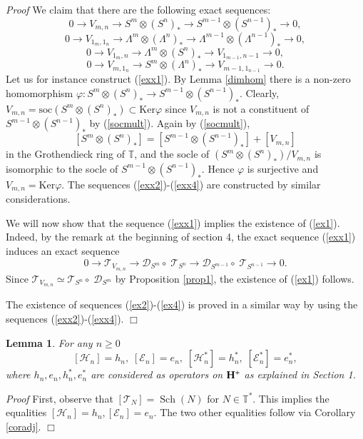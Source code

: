 \documentclass[11pt]{amsart}
\newcounter{theorem}
\newtheorem{lemma}[theo]{Lemma}
\renewenvironment{proof}{ \emph{Proof}}{$\Box$}
\newcommand{\TT}{\mathbb{T}}
\renewcommand {\phi} {\varphi}
\newcommand{\soc}{\mathrm{soc}}
\newcommand{\Ker}{\mathrm{Ker}}
\begin{document}
\begin{proof} We claim that there are the following exact sequences:
\begin{equation}\label{exx1}
0\rightarrow V_{m,n}\rightarrow S^m\otimes (S^n)_*\rightarrow S^{m-1}\otimes (S^{n-1})_*\rightarrow 0,
\end{equation}
\begin{equation}\label{exx2}
0\rightarrow V_{1_m,1_n}\rightarrow \Lambda^m\otimes (\Lambda^n)_*\rightarrow\Lambda^{m-1}\otimes (\Lambda^{n-1})_*\rightarrow 0,
\end{equation}
\begin{equation}\label{exx3}
0\rightarrow V_{1_m,n}\rightarrow \Lambda^m\otimes (S^n)_*\rightarrow V_{1_{m-1},n-1}\rightarrow 0,
\end{equation}
\begin{equation}\label{exx4}
0\rightarrow V_{m,1_n}\rightarrow S^m\otimes(\Lambda^n)_*\rightarrow V_{m-1,1_{n-1}}\rightarrow 0.
\end{equation}
Let us for instance construct (\ref{exx1}). By Lemma \ref{dimhom} there is a non-zero
homomorphism $\phi:S^m\otimes (S^n)_*\rightarrow S^{m-1}\otimes (S^{n-1})_*$. Clearly, 
$V_{m,n}=\soc(S^m\otimes (S^n)_*)\subset \Ker\phi$ since $V_{m,n}$ is not a
constituent of $S^{m-1}\otimes (S^{n-1})_*$ by (\ref{socmult}). Again by (\ref{socmult}),
$$[S^m\otimes (S^n)_*]=[S^{m-1}\otimes (S^{n-1})_*]+[V_{m,n}]$$
in the Grothendieck ring of $\mathbb T$, and the socle of  $(S^m\otimes (S^n)_*)/V_{m,n}$
is isomorphic to the socle of $S^{m-1}\otimes (S^{n-1})_*$. Hence $\phi$
is surjective and $V_{m,n}=\Ker\phi$.
The sequences (\ref{exx2})-(\ref{exx4}) are constructed by similar considerations.

We will now show that the sequence (\ref{exx1}) implies the existence
of (\ref{ex1}). Indeed, by the remark at the beginning of section 4, the exact sequence 
(\ref{exx1}) induces  an exact sequence
$$0\rightarrow \mathcal T_{V_{m,n}}\rightarrow\mathcal D_{S^m}\circ\; \mathcal T_{S^n}\rightarrow \mathcal D_{S^{m-1}}\circ\; \mathcal T_{S^{n-1}}\rightarrow 0.$$
Since $\mathcal T_{V_{m,n}}\simeq \mathcal T_{S^n}\circ\;\mathcal D_{S^m}$ by Proposition \ref{prop1}, the existence of 
(\ref{ex1}) follows.

The existence of sequences (\ref{ex2})-(\ref{ex4}) is proved in a
similar way by using the sequences (\ref{exx2})-(\ref{exx4}).
\end{proof}

\begin{lemma}\label{pass} For any $n\geq 0$
$$[\mathcal H_n]=h_n ,\; [\mathcal E_n]=e_n,\;[\mathcal H_n^*]=h_n^*,\; [\mathcal E_n^*]=e_n^*,$$
where $h_n,e_n,h_n^*,e_n^*$ are considered as operators on $\bold{H}^+$
as explained in Section 1. 
\end{lemma}
\begin{proof} First, observe that $[\mathcal T_N]=\operatorname{Sch}(N)$ for $N\in\TT^*$. This implies the equalities $[\mathcal H_n]=h_n , [\mathcal E_n]=e_n$.
The two other equalities follow via  Corollary \ref{coradj}. 
\end{proof}
\end{document}
